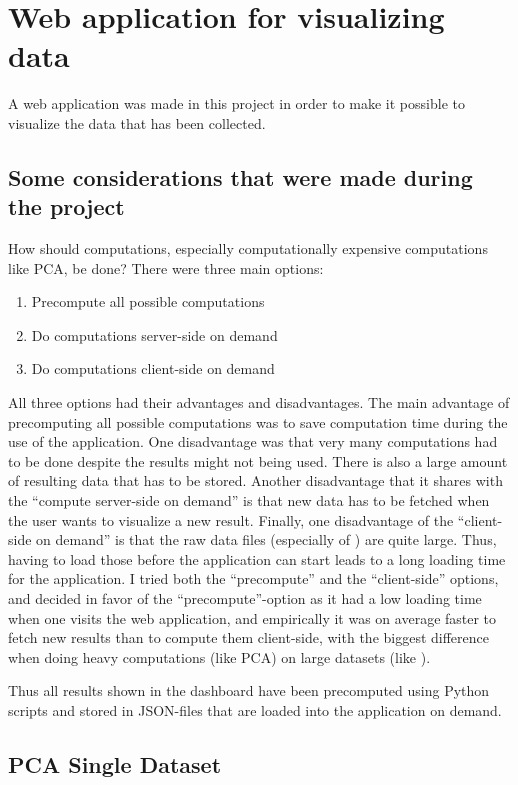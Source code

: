 {{{{{{{{{{{{{{{\section{Web application for visualizing data}
\label{sec:res_web_application}
A web application was made in this project in order to make it possible to visualize the data that has been collected.

\subsection{Some considerations that were made during the project}
How should computations, especially computationally expensive computations like PCA, be done? There were three main options:
\begin{enumerate}
    \item Precompute all possible computations
    \item Do computations server-side on demand
    \item Do computations client-side on demand
\end{enumerate}
All three options had their advantages and disadvantages. The main advantage of precomputing all possible computations was to save computation time during the use of the application. One disadvantage was that very many computations had to be done despite the results might not being used. There is also a large amount of resulting data that has to be stored. Another disadvantage that it shares with the ``compute server-side on demand'' is that new data has to be fetched when the user wants to visualize a new result. Finally, one disadvantage of the ``client-side on demand'' is that the raw data files (especially of \citet{Asakura2020}) are quite large. Thus, having to load those before the application can start leads to a long loading time for the application. I tried both the ``precompute'' and the ``client-side'' options, and decided in favor of the ``precompute''-option as it had a low loading time when one visits the web application, and empirically it was on average faster to fetch new results than to compute them client-side, with the biggest difference when doing heavy computations (like PCA) on large datasets (like \citet{Asakura2020}).

Thus all results shown in the dashboard have been precomputed using Python scripts and stored in JSON-files that are loaded into the application on demand.

\subsection{PCA Single Dataset}

}}}}}}}}}}}}}}}
